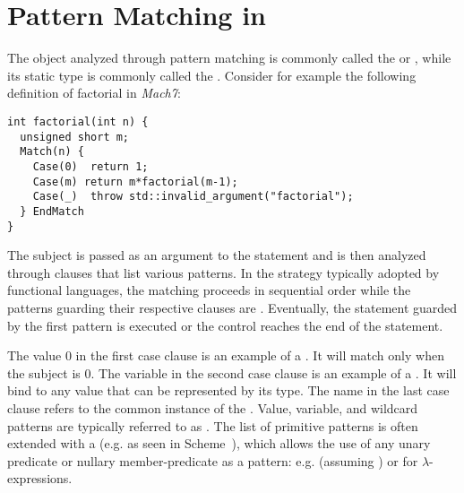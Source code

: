 \section{Pattern Matching in \Cpp{}} %
\label{sec:cpppat}



The object analyzed through pattern matching is commonly called the  
or , while its static type is commonly called the .
Consider for example the following definition of factorial in \emph{Mach7}:

\begin{lstlisting}[keepspaces]
int factorial(int n) {
  unsigned short m;
  Match(n) {
    Case(0)  return 1;
    Case(m) return m*factorial(m-1);
    Case(_)  throw std::invalid_argument("factorial");
  } EndMatch
}
\end{lstlisting}

\noindent
The subject  is passed as an argument to the  statement and is 
then analyzed through  clauses that list various patterns. In the 
 strategy typically adopted by functional languages, the 
matching proceeds in sequential order while the patterns guarding their 
respective clauses are . Eventually, the statement guarded by the 
first  pattern is executed or the control reaches the end of 
the  statement.

The value 0 in the first case clause is an example of a . It 
will match only when the subject  is 0. The variable  in the 
second case clause is an example of a . It will bind to 
any value that can be represented by its type. The name \code{_} in the last 
case clause refers to the common instance of the . Value, 
variable, and wildcard patterns are typically referred to as . The list of primitive patterns is often extended with a  (e.g. as seen in Scheme~\cite{Wright95}), which allows the use of any 
unary predicate or nullary member-predicate as a pattern: e.g.  (assuming ) or  
for $\lambda$-expressions. 

